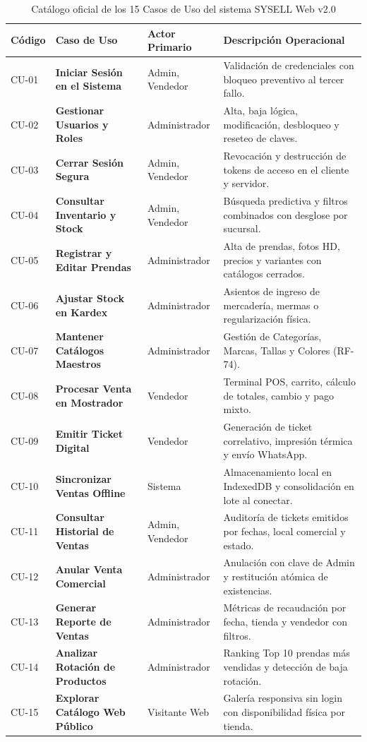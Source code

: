 \begin{table}[H]
\centering
\small
\begin{tabularx}{\textwidth}{>{\ttfamily\centering}p{1.4cm} >{\raggedright\bfseries}p{4.2cm} >{\raggedright}p{2.6cm} Y}
\toprule
\textbf{Código} & \textbf{Caso de Uso} & \textbf{Actor Primario} & \textbf{Descripción Operacional} \\
\midrule
CU-01 & Iniciar Sesión en el Sistema & Admin, Vendedor & Validación de credenciales con bloqueo preventivo al tercer fallo. \\
CU-02 & Gestionar Usuarios y Roles & Administrador & Alta, baja lógica, modificación, desbloqueo y reseteo de claves. \\
CU-03 & Cerrar Sesión Segura & Admin, Vendedor & Revocación y destrucción de tokens de acceso en el cliente y servidor. \\
CU-04 & Consultar Inventario y Stock & Admin, Vendedor & Búsqueda predictiva y filtros combinados con desglose por sucursal. \\
CU-05 & Registrar y Editar Prendas & Administrador & Alta de prendas, fotos HD, precios y variantes con catálogos cerrados. \\
CU-06 & Ajustar Stock en Kardex & Administrador & Asientos de ingreso de mercadería, mermas o regularización física. \\
CU-07 & Mantener Catálogos Maestros & Administrador & Gestión de Categorías, Marcas, Tallas y Colores (RF-74). \\
CU-08 & Procesar Venta en Mostrador & Vendedor & Terminal POS, carrito, cálculo de totales, cambio y pago mixto. \\
CU-09 & Emitir Ticket Digital & Vendedor & Generación de ticket correlativo, impresión térmica y envío WhatsApp. \\
CU-10 & Sincronizar Ventas Offline & Sistema & Almacenamiento local en IndexedDB y consolidación en lote al conectar. \\
CU-11 & Consultar Historial de Ventas & Admin, Vendedor & Auditoría de tickets emitidos por fechas, local comercial y estado. \\
CU-12 & Anular Venta Comercial & Administrador & Anulación con clave de Admin y restitución atómica de existencias. \\
CU-13 & Generar Reporte de Ventas & Administrador & Métricas de recaudación por fecha, tienda y vendedor con filtros. \\
CU-14 & Analizar Rotación de Productos & Administrador & Ranking Top 10 prendas más vendidas y detección de baja rotación. \\
CU-15 & Explorar Catálogo Web Público & Visitante Web & Galería responsiva sin login con disponibilidad física por tienda. \\
\bottomrule
\end{tabularx}
\caption{Catálogo oficial de los 15 Casos de Uso del sistema SYSELL Web v2.0}
\label{tab:casos_de_uso}
\end{table}

